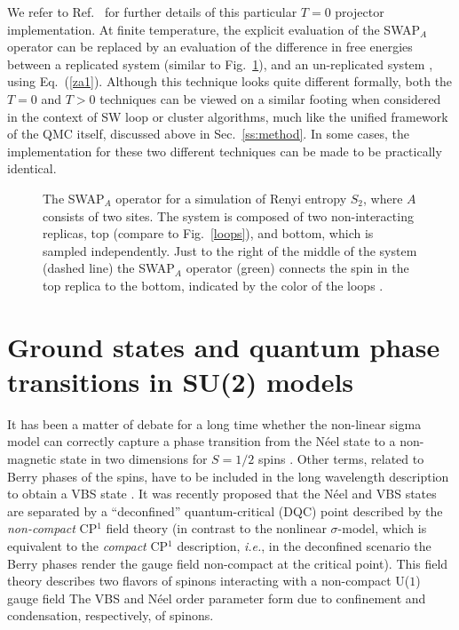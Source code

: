 \documentclass[range]{ar2e}
\begin{document}
We refer to Ref.~\cite{Kallin11} for further details of this particular $T=0$ projector implementation.  At finite temperature, the explicit evaluation 
of the SWAP$_A$ operator can be replaced by an evaluation of the difference in free energies between a replicated system (similar to Fig.~\ref{swap}), 
and an un-replicated system \cite{Melko10}, using Eq.~(\ref{za1}).  Although this technique looks quite different formally, both the $T=0$ and $T>0$ techniques 
can be viewed on a similar footing when considered in the context of SW loop or cluster algorithms, much like the unified framework of the QMC itself, discussed
above in Sec.~\ref{ss:method}. In some cases, the implementation for these two different techniques can be made to be practically identical.  

\begin{figure}
\centerline{}
\caption{The {\rm SWAP}$_A$ operator for a simulation of Renyi entropy $S_2$, where $A$ consists of two sites.  The system is composed of two non-interacting 
replicas, top (compare to Fig.~\ref{loops}), and bottom, which is sampled independently.  Just to the right of the middle of the system (dashed line) 
the {\rm SWAP}$_A$ operator (green) connects the spin in the top replica to the bottom, indicated by the color of the loops \cite{Kallin11}.}
\label{swap}
\end{figure}

\section{Ground states and quantum phase transitions in SU(2) models}
\label{sec:su2models}

It has been a matter of debate for a long time whether the non-linear sigma model can correctly capture a phase transition from the N\'eel state 
to a non-magnetic state in two dimensions for $S=1/2$ spins \cite{Chakravarty89}. Other terms, related to Berry phases of the spins, have to be included in the long wavelength description to obtain a VBS state \cite{Read90,murthy1990:mono}. It was recently proposed that the N\'eel and VBS states are separated 
by a ``deconfined'' quantum-critical (DQC) point \cite{Senthil04a} described by the {\it non-compact} CP$^1$ field theory (in contrast to the nonlinear 
$\sigma$-model, which is equivalent to the {\it compact} CP$^1$ description, {\em i.e.}, in the deconfined scenario the Berry phases render the gauge field non-compact at the critical point).
This field theory describes two flavors of spinons interacting with a non-compact U($1$) gauge field  The VBS and N\'eel order parameter form due to confinement and condensation, 
respectively, of spinons. 
\end{document}
